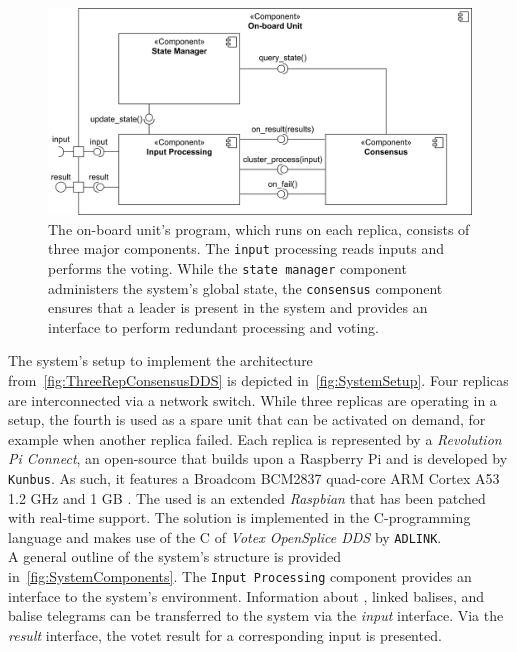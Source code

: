 \begin{figure}[!hb]
	\centering
	\includegraphics[width=0.9\linewidth]{images/Components}
	\caption{The on-board unit's program, which runs on each replica, consists of three major components. The \texttt{input} processing reads inputs and performs the voting. While the \texttt{state manager} component administers the system's global state, the \texttt{consensus} component ensures that a leader is present in the system and provides an interface to perform redundant processing and voting.}
	\label{fig:SystemComponents}
\end{figure}

The system's setup to implement the architecture from~\autoref{fig:ThreeRepConsensusDDS} is depicted in~\autoref{fig:SystemSetup}.
Four replicas are interconnected via a network switch.
While three replicas are operating in a  setup, the fourth is used as a spare unit that can be activated on demand, for example when another replica failed.
Each replica is represented by a \textit{Revolution Pi Connect}, an open-source  that builds upon a Raspberry Pi and is developed by \texttt{Kunbus}.
As such, it features a Broadcom BCM2837 quad-core ARM Cortex A53 1.2 GHz  and 1 GB .
The used  is an extended \textit{Raspbian}  that has been patched with real-time support.
The solution is implemented in the C-programming language and makes use of the C  of \textit{Votex OpenSplice DDS} by \texttt{ADLINK}.
\\

A general outline of the system's structure is provided in~\autoref{fig:SystemComponents}.
The \texttt{Input Processing} component provides an interface to the system's environment.
Information about , linked balises, and balise telegrams can be transferred to the system via the \textit{input} interface.
Via the \textit{result} interface, the votet result for a corresponding input is presented.
\\

